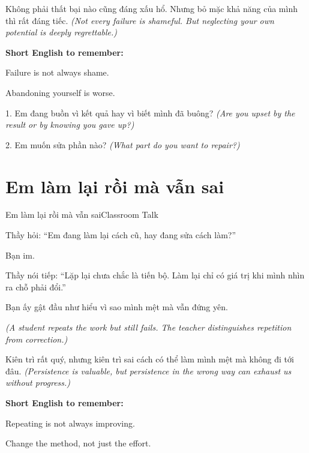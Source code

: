 \begin{baihoc}
Không phải thất bại nào cũng đáng xấu hổ. Nhưng bỏ mặc khả năng của mình thì rất đáng tiếc.
\textit{(Not every failure is shameful. But neglecting your own potential is deeply regrettable.)}
\end{baihoc}

\begin{ghinhoanh}
\textbf{Short English to remember:}

Failure is not always shame.

Abandoning yourself is worse.
\end{ghinhoanh}

\begin{tuhocnhanh}
1. Em đang buồn vì kết quả hay vì biết mình đã buông? \textit{(Are you upset by the result or by knowing you gave up?)}

2. Em muốn sửa phần nào? \textit{(What part do you want to repair?)}
\end{tuhocnhanh}
\ngancach

\section{Em làm lại rồi mà vẫn sai}
\begin{truyen}{Em làm lại rồi mà vẫn sai}{Classroom Talk}

Thầy hỏi: ``Em đang làm lại cách cũ, hay đang sửa cách làm?''

Bạn im.

Thầy nói tiếp: ``Lặp lại chưa chắc là tiến bộ. Làm lại chỉ có giá trị khi mình nhìn ra chỗ phải đổi.''

Bạn ấy gật đầu như hiểu vì sao mình mệt mà vẫn đứng yên.

\textit{(A student repeats the work but still fails. The teacher distinguishes repetition from correction.)}
\end{truyen}

\begin{baihoc}
Kiên trì rất quý, nhưng kiên trì sai cách có thể làm mình mệt mà không đi tới đâu.
\textit{(Persistence is valuable, but persistence in the wrong way can exhaust us without progress.)}
\end{baihoc}

\begin{ghinhoanh}
\textbf{Short English to remember:}

Repeating is not always improving.

Change the method, not just the effort.
\end{ghinhoanh}

